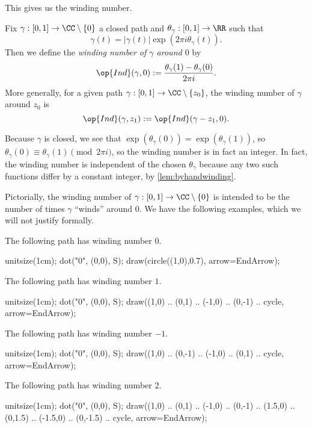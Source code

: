 This gives us the winding number.
\begin{definition}
	Fix $\gamma:[0,1]\to\CC\setminus\{0\}$ a closed path and $\theta_\gamma:[0,1]\to\RR$ such that
	\[\gamma(t)=|\gamma(t)|\exp(2\pi i\theta_\gamma(t)).\]
	Then we define the \textit{winding number of $\gamma$ around $0$} by
	\[\op{Ind}(\gamma,0):=\frac{\theta_\gamma(1)-\theta_\gamma(0)}{2\pi i}.\]
	More generally, for a given path $\gamma:[0,1]\to\CC\setminus\{z_0\}$, the winding number of $\gamma$ around $z_0$ is
	\[\op{Ind}(\gamma,z_1):=\op{Ind}(\gamma-z_1,0).\]
\end{definition}
\begin{remark}
	Because $\gamma$ is closed, we see that $\exp(\theta_\gamma(0))=\exp(\theta_\gamma(1))$, so $\theta_\gamma(0)\equiv\theta_\gamma(1)\pmod{2\pi i}$, so the winding number is in fact an integer. In fact, the winding number is independent of the chosen $\theta_\gamma$ because any two such functions differ by a constant integer, by \autoref{lem:byhandwinding}.
\end{remark}
Pictorially, the winding number of $\gamma:[0,1]\to\CC\setminus\{0\}$ is intended to be the number of times $\gamma$ ``winds'' around $0$. We have the following examples, which we will not justify formally.
\begin{example}
	The following path has winding number $0$.
	\begin{center}
		\begin{asy}
			unitsize(1cm);
			dot("$0$", (0,0), S);
			draw(circle((1,0),0.7), arrow=EndArrow);
		\end{asy}
	\end{center}
\end{example}
\begin{example}
	The following path has winding number $1$.
	\begin{center}
		\begin{asy}
			unitsize(1cm);
			dot("$0$", (0,0), S);
			draw((1,0) .. (0,1) .. (-1,0) .. (0,-1) .. cycle, arrow=EndArrow);
		\end{asy}
	\end{center}
\end{example}
\begin{example}
	The following path has winding number $-1$.
	\begin{center}
		\begin{asy}
			unitsize(1cm);
			dot("$0$", (0,0), S);
			draw((1,0) .. (0,-1) .. (-1,0) .. (0,1) .. cycle, arrow=EndArrow);
		\end{asy}
	\end{center}
\end{example}
\begin{example}
	The following path has winding number $2$.
	\begin{center}
		\begin{asy}
			unitsize(1cm);
			dot("$0$", (0,0), S);
			draw((1,0) .. (0,1) .. (-1,0) .. (0,-1) .. (1.5,0) .. (0,1.5) .. (-1.5,0) .. (0,-1.5) .. cycle, arrow=EndArrow);
		\end{asy}
	\end{center}
\end{example}